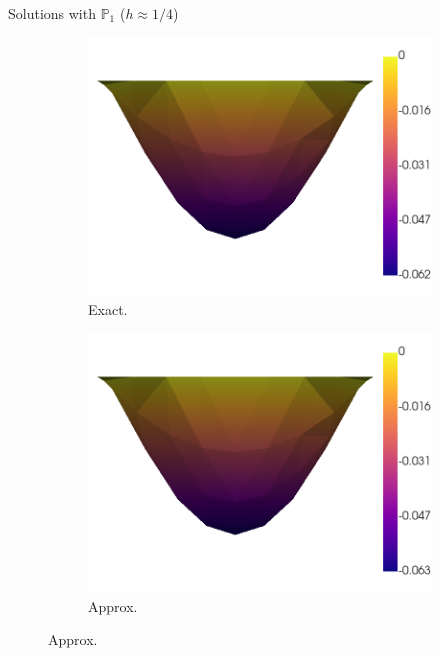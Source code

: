 \begin{frame}{Solutions with $\mathbb{P}_1$ ($h\approx 1/4$)}
	\begin{figure}[h!]
		\begin{subfigure}{0.49\textwidth}
			\centering
			\includegraphics[scale=0.2]{img/Difusion/diff_u_ex_nx-4.png}
			\caption{Exact.}
		\end{subfigure}
		\begin{subfigure}{0.49\textwidth}
			\centering
			\includegraphics[scale=0.2]{img/Difusion/diff_u_FE_nx-4.png}
			\caption{Approx.}
		\end{subfigure}
	\end{figure}
	\end{frame}
